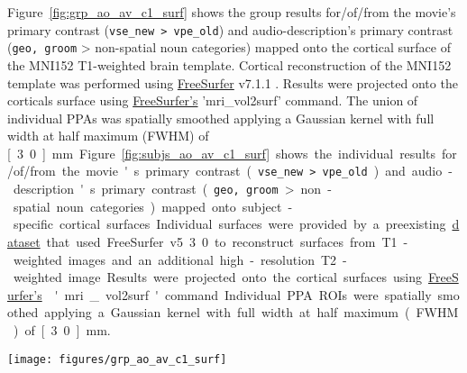 \documentclass[english,11pt]{article}
\begin{document}
Figure~\ref{fig:grp_ao_av_c1_surf} shows the group results for/of/from the
movie's primary contrast (\texttt{vse\_new > vpe\_old}) and audio-description's
primary contrast (\texttt{geo, groom} > non-spatial noun categories) mapped onto
the cortical surface of the MNI152 T1-weighted brain template.
Cortical reconstruction of the MNI152 template was performed using
\href{https://surfer.nmr.mgh.harvard.edu}{FreeSurfer} v7.1.1
\citep{dale1999cortical}.
Results were projected onto the corticals surface using
\href{https://surfer.nmr.mgh.harvard.edu}{FreeSurfer's} \citep{dale1999cortical}
'mri\_vol2surf' command.
The union of individual PPAs was spatially smoothed applying a Gaussian kernel
with full width at half maximum (FWHM) of \unit[3.0]{mm}.
Figure~\ref{fig:subjs_ao_av_c1_surf} shows the individual results for/of/from
the movie's primary contrast (\texttt{vse\_new > vpe\_old}) and
audio-description's primary contrast (\texttt{geo, groom} > non-spatial noun
categories) mapped onto subject-specific cortical surfaces.
Individual surfaces were provided by a preexisting
\href{https://github.com/psychoinformatics-de/studyforrest-data-freesurfer.git}{dataset}
that used FreeSurfer v5.3.0 to reconstruct surfaces from T1-weighted images and
an additional high-resolution T2-weighted image.
Results were projected onto the cortical surfaces using
\href{https://surfer.nmr.mgh.harvard.edu}{FreeSurfer's} \citep{dale1999cortical}
'mri\_vol2surf' command.
Individual PPA ROIs were spatially smoothed applying a Gaussian kernel with full
width at half maximum (FWHM) of \unit[3.0]{mm}.

\begin{figure*}[tbp]
\centering
    \texttt{[image: figures/grp\_ao\_av\_c1\_surf]}

    \caption[NAME]
    {Mixed-effects group-level (N=14) clusters ($Z$>3.4, $p$<.05
    cluster-corrected) of activity correlated with the processing of spatial
    information are projected onto the surface of the MNI152
    T1-weighted brain template.
    The results of the audio-description's primary $t$-contrast (blue) that
    compares geometry-related nouns spoken by the narrator to non-spatial
    nouns (\texttt{geo, groom} > all non-spatial categories) are overlaid
    on the movie's primary $t$-contrast (red) that compares cuts to a
    setting depicted for the first time with cuts within a recurring setting
    (\texttt{vse\_new > vpe\_old}).
    Black: outline of the union of individual PPA ROIs reported by
    \citet{sengupta2016extension}.
    }
    \label{fig:grp_ao_av_c1_surf}
\end{figure*}
\end{document}
